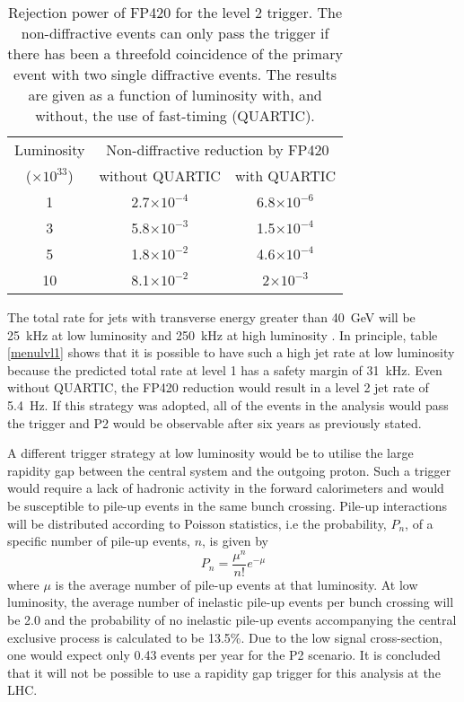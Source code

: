 \begin{table}[t]
\centering
\begin{tabular}{|c|c|c|}
\hline
Luminosity & \multicolumn{2}{c|}{Non-diffractive reduction by FP420} \\
($\times10^{33}$) & without QUARTIC & with QUARTIC \\
\hline
1 & 2.7$\times10^{-4}$ & 6.8$\times10^{-6}$ \\ 
3 & 5.8$\times10^{-3}$ & 1.5$\times10^{-4}$ \\ 
5 & 1.8$\times10^{-2}$ & 4.6$\times10^{-4}$\\ 
10 & 8.1$\times10^{-2}$& 2$\times10^{-3}$\\ 
\hline
\end{tabular}
\caption[Non-diffractive rejection power of FP420]{Rejection power of FP420 for the level 2 trigger. The non-diffractive events can only pass the trigger if there has been a threefold coincidence of the primary event with two single diffractive events. The results are given as a function of luminosity with, and without, the use of fast-timing (QUARTIC). \label{fp420lvl2}}
\end{table}%

The total rate for jets with transverse energy greater than 40~GeV will be 25~kHz at low luminosity and 250~kHz at high luminosity \cite{:1999fq:Chapter11,Grothe:2006dj}. In principle, table \ref{menulvl1} shows that it is possible to have such a high jet rate at low luminosity because the predicted total rate at level 1 has a safety margin of 31~kHz. Even without QUARTIC, the FP420 reduction would result in a level 2 jet rate of 5.4~Hz. If this strategy was adopted, all of the events in the analysis would pass the trigger and P2 would be observable after six years as previously stated.

A different trigger strategy at low luminosity would be to utilise the large rapidity gap between the central system and the outgoing proton. Such a trigger would require a lack of hadronic activity in the forward calorimeters and would be susceptible to pile-up events in the same bunch crossing.
Pile-up interactions will be distributed according to Poisson statistics, i.e the probability, $P_n$, of a specific number of pile-up events, $n$, is given by
\begin{equation}
P_n = \frac{\mu^n}{n!}e^{-\mu}
\end{equation}
where $\mu$ is the average number of pile-up events at that luminosity. At low luminosity, the average number of inelastic pile-up events per bunch crossing will be 2.0 and the probability of no inelastic pile-up events accompanying the central exclusive process is calculated to be 13.5\%. Due to the low signal cross-section, one would expect only 0.43 events per year for the P2 scenario. It is concluded that it will not be possible to use a rapidity gap trigger for this analysis at the LHC.

